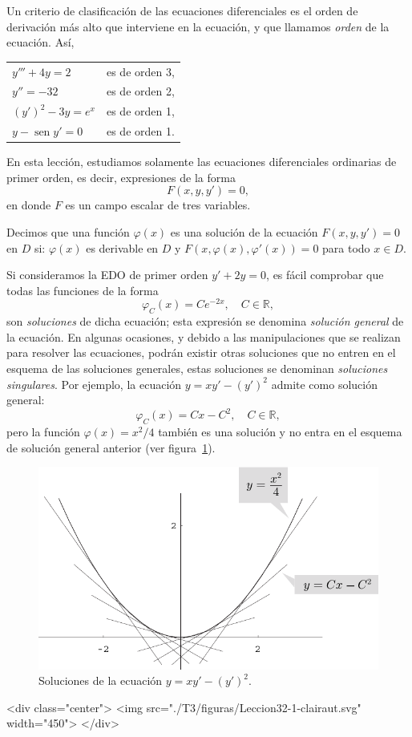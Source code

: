 Un criterio de clasificación de las ecuaciones diferenciales es el orden de derivación más alto que interviene en la ecuación, y que llamamos \emph{orden} de la ecuación. Así,
\begin{center}\begin{tabular}{ll}
$y'''+4y =2$  			& es de orden 3,\\
$y''=-32$ 					& es de orden 2,\\
$(y')^2-3y=e^x$ 		& es de orden 1,\\
$y-\operatorname{sen} y' =0$ 			& es de orden 1.
\end{tabular}\end{center}
%
En esta lección, estudiamos solamente las ecuaciones diferenciales ordinarias de primer orden, es decir, expresiones de la forma
\[
F(x,y,y')=0,
\]
en donde $F$ es un campo escalar de tres variables.
\begin{definicion}
Decimos que una función $\varphi(x)$ es una solución de la ecuación $F(x,y,y')=0$ en
$\mathit D$ si:  $\varphi(x)$ es  derivable en $\mathit D$ y $F(x,\varphi(x),\varphi'(x))=0$ para todo $x\in\mathit  D$.
\end{definicion}

Si consideramos la EDO de primer orden $y'+2y=0$, es fácil comprobar que todas las funciones de la forma 
\[
\varphi_C(x)=Ce^{-2x},\quad C\in\mathbb{R},
\]
son \emph{soluciones} de dicha ecuación; esta expresión se denomina \emph{solución general} de la ecuación. En algunas ocasiones, y debido a las manipulaciones que se realizan para resolver las ecuaciones, podrán existir otras soluciones que no entren en el esquema de las soluciones generales, estas soluciones se denominan \emph{soluciones singulares}. Por ejemplo, la ecuación $y=xy'-(y')^2$ admite como solución general:
$$
\varphi_C(x)=Cx-C^2,\quad C\in \mathbb{R},
$$
pero la función $\varphi(x)=x^2/4$ también es una solución y no entra en el esquema de solución general anterior (ver figura~\ref{fig:clairaut}).
\begin{latexonly}
\begin{figure}
\begin{center}
\includegraphics[width=.8\textwidth]{T3/figs/clairaut.pdf}
\end{center}
\caption{Soluciones de la ecuación $y=xy'-(y')^2$.}\label{fig:clairaut}
\end{figure}
\end{latexonly}
\begin{rawhtml}
<div class="center">
<img src="./T3/figuras/Leccion32-1-clairaut.svg" width="450">
</div>
\end{rawhtml}


